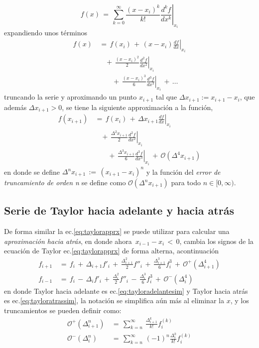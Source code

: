 \documentclass[9pt,technote,twoside,letterpaper,twocolumn]{IEEEtran}
\begin{document}
\begin{equation}
  f(x)\,=\,\sum^\infty_{k=0}\frac{(x-x_i)^k}{k!}\left.\frac{d^kf}{dx^k}\right|_{x_i}
  \label{eq:taylor}
\end{equation}
expandiendo unos términos
\begin{equation}
  \begin{split}
    f(x)&\,=\,f(x_i)\,+\,(x-x_i)\left.\frac{df}{dx}\right|_{x_i}\\
    &\quad+\,\frac{(x-x_i)^2}{2}\left.\frac{d^2f}{dx^2}\right|_{x_i}\\
    &\qquad+\,\frac{(x-x_i)^3}{6}\left.\frac{d^3f}{dx^3}\right|_{x_i}\,+\,\ldots
  \end{split}
  \label{eq:taylorexp}
\end{equation}
truncando la serie y aproximando un punto $x_{i+1}$ tal que $\Delta x_{i+1}:=x_{i+1}-x_i$, que además $\Delta x_{i+1}>0$, se tiene la siguiente approximación a la función,
\begin{equation}
  \begin{split}
    f(x_{i+1})&\,=\,f(x_i)\,+\,\Delta x_{i+1}\left.\frac{df}{dx}\right|_{x_i}\\
    &\quad+\,\frac{\Delta^2 x_{i+1}}{2}\left.\frac{d^2f}{dx^2}\right|_{x_i}\\
    &\qquad+\,\frac{\Delta^3 x_{i+1}}{6}\left.\frac{d^3f}{dx^3}\right|_{x_i}\,+\,\mathcal{O}(\Delta^4 x_{i+1})
  \end{split}
  \label{eq:taylorapprx}
\end{equation}
en donde se define $\Delta^n x_{i+1}\,:=\,(x_{i+1}-x_i)^n$ y la función del \emph{error de truncamiento de orden n} se define como $\mathcal{O}(\Delta^n x_{i+1})$ para todo $n\in[0,\infty)$.

\subsection{Serie de Taylor hacia adelante y hacia atrás}
\label{sec:backford}
 De forma similar la ec.\ref{eq:taylorapprx} se puede utilizar para calcular una \emph{aproximación hacia atrás}, en donde ahora $\,x_{i-1}-x_i\,<\,0$, cambia los signos de la ecuación de Taylor ec.\ref{eq:taylorapprx} de forma alterna, acontinuación
\begin{align}
  f_{i+1}&\,=\,f_i\,+\,\Delta_{i+1}f'_i\,+\,\frac{\Delta^2_{i+1}}{2}f''_i\,+\,\frac{\Delta^3_{i+1}}{6}f^3_i\,+\,\mathcal{O}^+(\Delta^4_{i+1})  \label{eq:tayloradelantesim}
  \\
 f_{i-1}&\,=\,f_i\,-\,\Delta_{i}f'_i\,+\,\frac{\Delta^2_{i}}{2}f''_i\,-\,\frac{\Delta^3_{i}}{6}f^3_i\,+\,\mathcal{O}^-(\Delta^4_{i}) 
  \label{eq:tayloratrassim}
\end{align}
en donde Taylor hacia adelante es ec.\ref{eq:tayloradelantesim} y Taylor hacia atrás es ec.\ref{eq:tayloratrassim},  la notación se simplifica aún más al eliminar la $x$, y los truncamientos se pueden definir como:
\begin{align}
  \mathcal{O}^+(\Delta^n_{i+1})&\,=\,\sum^\infty_{k=n}\,\frac{\Delta^k_{i+1}}{k!}f^{(k)}_i\label{eq:Otayloradelante}\\
  \mathcal{O}^-(\Delta^n_{i})&\,=\,\sum^\infty_{k=n}\,(-1)^n\frac{\Delta^k_i}{k!}f^{(k)}_i\label{eq:Otayloratras}
\end{align}
\end{document}

